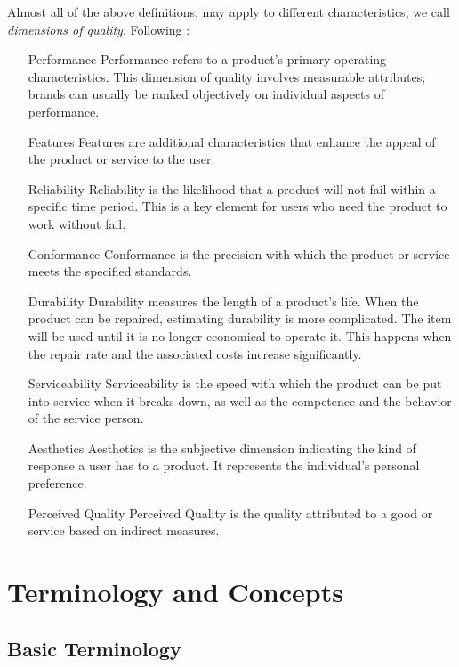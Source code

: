 \documentclass[12pt,a4paper]{report}
\begin{document}
Almost all of the above definitions, may apply to different characteristics, we call \emph{dimensions of quality}. Following \cite{wikipedia_eight_2015} :
\begin{enumerate}
\item [Performance] Performance refers to a product's primary operating characteristics. This dimension of quality involves measurable attributes; brands can usually be ranked objectively on individual aspects of performance.
\item [{Features}] Features are additional characteristics that enhance the appeal of the product or service to the user.
\item [{Reliability}] Reliability is the likelihood that a product will not fail within a specific time period. This is a key element for users who need the product to work without fail.
\item [{Conformance}] Conformance is the precision with which the product or service meets the specified standards.
\item [{Durability}] Durability measures the length of a product’s life. When the product can be repaired, estimating durability is more complicated. The item will be used until it is no longer economical to operate it. This happens when the repair rate and the associated costs increase significantly.
\item [{Serviceability}] Serviceability is the speed with which the product can be put into service when it breaks down, as well as the competence and the behavior of the service person.
\item [{Aesthetics}] Aesthetics is the subjective dimension indicating the kind of response a user has to a product. It represents the individual’s personal preference.
\item [{Perceived Quality}] Perceived Quality is the quality attributed to a good or service based on indirect measures.
\end{enumerate}


\section{Terminology and Concepts}

\subsection{Basic Terminology}
\end{document}
